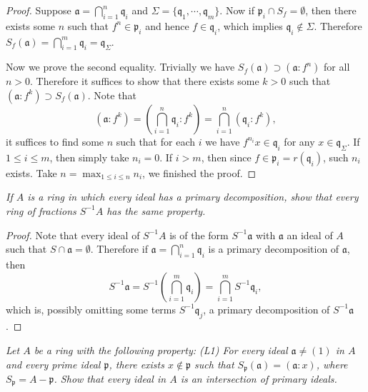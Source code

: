 \begin{proof}
Suppose $\mathfrak{a}=\bigcap_{i=1}^n\mathfrak{q}_i$ and $\Sigma=\{\mathfrak{q}_1,\cdots,\mathfrak{q}_m\}$. Now if $\mathfrak{p}_i\cap S_f=\emptyset$, then there exists some $n$ such that $f^n\in\mathfrak{p}_i$ and hence $f\in\mathfrak{q}_i$, which implies $\mathfrak{q}_i\notin\Sigma$. Therefore $S_f\left( \mathfrak{a} \right) =\bigcap_{i=1}^m{\mathfrak{q} _i}=\mathfrak{q} _{\Sigma}$.\par
Now we prove the second equality. Trivially we have $S_f(\mathfrak{a})\supset(\mathfrak{a}:f^n)$ for all $n>0$. Therefore it suffices to show that there exists some $k>0$ such that $(\mathfrak{a}:f^k)\supset S_f(\mathfrak{a})$. Note that 
$$
\left( \mathfrak{a} :f^k \right) =\left( \bigcap_{i=1}^n{\mathfrak{q} _i}:f^k \right) =\bigcap_{i=1}^n{\left( \mathfrak{q} _i:f^k \right)},
$$
it suffices to find some $n$ such that for each $i$ we have $f^{n_i}x\in\mathfrak{q}_i$ for any $x\in\mathfrak{q}_\Sigma$. If $1\le i\le m$, then simply take $n_i=0$. If $i>m$, then since $f\in\mathfrak{p}_i=r(\mathfrak{q}_i)$, such $n_i$ exists. Take $n=\max_{1\le i\le n}n_i$, we finished the proof.
\end{proof}
\begin{problem}\em
If $A$ is a ring in which every ideal has a primary decomposition, show that every ring of fractions $S^{-1}A$ has the same property.
\end{problem}
\begin{proof}
Note that every ideal of $S^{-1}A$ is of the form $S^{-1}\mathfrak{a}$ with $\mathfrak{a}$ an ideal of $A$ such that $S\cap\mathfrak{a}=\emptyset$. Therefore if $\mathfrak{a}=\bigcap_{i=1}^n\mathfrak{q}_i$ is a primary decomposition of $\mathfrak{a}$, then 
$$
S^{-1}\mathfrak{a} =S^{-1}\left( \bigcap_{i=1}^m{\mathfrak{q} _i} \right) =\bigcap_{i=1}^m{S^{-1}\mathfrak{q} _i},
$$
which is, possibly omitting some terms $S^{-1}\mathfrak{q}_j$, a primary decomposition of $S^{-1}\mathfrak{a}$.
\end{proof}
\begin{problem}\em
Let $A$ be a ring with the following property: (L1) For every ideal $\mathfrak{a}\ne (1)$ in $A$ and every prime ideal $\mathfrak{p}$, there exists $x\notin\mathfrak{p}$ such that $S_\mathfrak{p}(\mathfrak{a})=(\mathfrak{a}:x)$, where $S_\mathfrak{p}=A-\mathfrak{p}$. Show that every ideal in $A$ is an intersection of primary ideals.
\end{problem}
